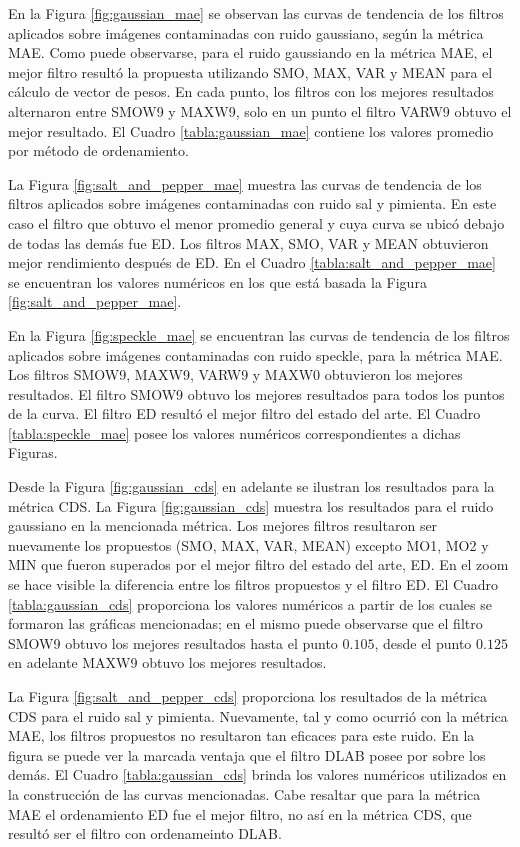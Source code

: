 En la Figura \ref{fig:gaussian_mae} se observan las curvas de tendencia de los filtros aplicados sobre imágenes contaminadas con ruido gaussiano, según la métrica MAE. Como puede observarse, para el ruido gaussiando en la métrica MAE, el mejor filtro resultó la propuesta utilizando SMO, MAX, VAR y MEAN para el cálculo de vector de pesos. En cada punto, los filtros con los mejores resultados alternaron entre SMOW9 y MAXW9, solo en un punto el filtro VARW9 obtuvo el mejor resultado. El Cuadro \ref{tabla:gaussian_mae} contiene los valores promedio por método de ordenamiento.

La Figura \ref{fig:salt_and_pepper_mae} muestra las curvas de tendencia de los filtros aplicados sobre imágenes contaminadas con ruido sal y pimienta. En este caso el filtro que obtuvo el menor promedio general y cuya curva se ubicó debajo de todas las demás fue ED. Los filtros MAX, SMO, VAR y MEAN obtuvieron mejor rendimiento después de ED. En el Cuadro \ref{tabla:salt_and_pepper_mae} se encuentran los valores numéricos en los que está basada la Figura \ref{fig:salt_and_pepper_mae}.

En la Figura \ref{fig:speckle_mae} se encuentran las curvas de tendencia de los filtros aplicados sobre imágenes contaminadas con ruido speckle, para la métrica MAE. Los filtros SMOW9, MAXW9, VARW9 y MAXW0 obtuvieron los mejores resultados. El filtro SMOW9 obtuvo los mejores resultados para todos los puntos de la curva. El filtro ED resultó el mejor filtro del estado del arte. El Cuadro \ref{tabla:speckle_mae} posee los valores numéricos correspondientes a dichas Figuras.

Desde la Figura \ref{fig:gaussian_cds} en adelante se ilustran los resultados para la métrica CDS. La Figura \ref{fig:gaussian_cds} muestra los resultados para el ruido gaussiano en la mencionada métrica. Los mejores filtros resultaron ser nuevamente los propuestos (SMO, MAX, VAR, MEAN) excepto MO1, MO2 y MIN que fueron superados por el mejor filtro del estado del arte, ED. En el zoom se hace visible la diferencia entre los filtros propuestos y el filtro ED. El Cuadro \ref{tabla:gaussian_cds} proporciona los valores numéricos a partir de los cuales se formaron las gráficas mencionadas; en el mismo puede observarse que el filtro SMOW9 obtuvo los mejores resultados hasta el punto $0.105$, desde el punto $0.125$ en adelante MAXW9 obtuvo los mejores resultados.

La Figura \ref{fig:salt_and_pepper_cds} proporciona los resultados de la métrica CDS para el ruido sal y pimienta. Nuevamente, tal y como ocurrió con la métrica MAE, los filtros propuestos no resultaron tan eficaces para este ruido. En la figura se puede ver la marcada ventaja que el filtro DLAB posee por sobre los demás. El Cuadro \ref{tabla:gaussian_cds} brinda los valores numéricos utilizados en la construcción de las curvas mencionadas. Cabe resaltar que para la métrica MAE el ordenamiento ED fue el mejor filtro, no así  en la métrica CDS, que resultó ser el filtro con ordenameinto DLAB.  

